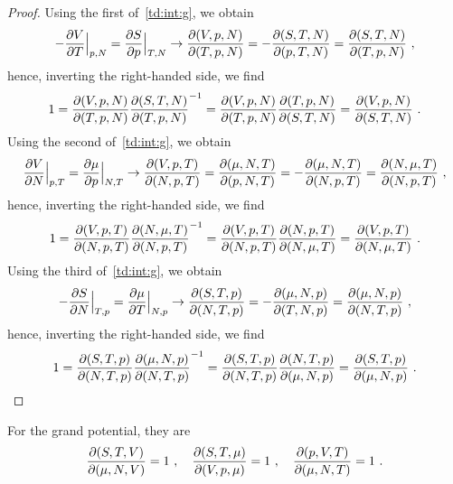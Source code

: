     \begin{proof}
        Using the first of~\eqref{td:int:g}, we obtain
        \begin{equation*}
            - \frac{\partial V}{\partial T} \Big \vert_{p, N} = \frac{\partial S}{\partial p} \Big \vert_{T, N} \rightarrow \frac{\partial(V, p, N)}{\partial(T, p, N)} = - \frac{\partial(S, T, N)}{\partial(p, T, N)} = \frac{\partial(S, T, N)}{\partial(T, p, N)} ~,
        \end{equation*} 
        hence, inverting the right-handed side, we find
        \begin{equation*}
            1 = \frac{\partial(V, p, N)}{\partial(T, p, N)} \frac{\partial(S, T, N)}{\partial(T, p, N)}^{-1} = \frac{\partial(V, p, N)}{\partial(T, p, N)} \frac{\partial(T, p, N)}{\partial(S, T, N)} = \frac{\partial(V, p, N)}{\partial(S, T, N)} ~.
        \end{equation*} 
        Using the second of~\eqref{td:int:g}, we obtain
        \begin{equation*}
            \frac{\partial V}{\partial N} \Big \vert_{p, T} = \frac{\partial\mu}{\partial p} \Big \vert_{N, T} \rightarrow \frac{\partial(V, p, T)}{\partial(N, p, T)} = \frac{\partial(\mu, N, T)}{\partial(p, N, T)} = - \frac{\partial(\mu, N, T)}{\partial(N, p, T)} = \frac{\partial(N, \mu, T)}{\partial(N, p, T)} ~,
        \end{equation*} 
        hence, inverting the right-handed side, we find
        \begin{equation*}
            1 = \frac{\partial(V, p, T)}{\partial(N, p, T)} \frac{\partial(N, \mu, T)}{\partial(N, p, T)}^{-1} = \frac{\partial(V, p, T)}{\partial(N, p, T)} \frac{\partial(N, p, T)}{\partial(N, \mu, T)} = \frac{\partial(V, p, T)}{\partial(N, \mu, T)} ~.
        \end{equation*} 
        Using the third of~\eqref{td:int:g}, we obtain
        \begin{equation*}
            - \frac{\partial S}{\partial N} \Big \vert_{T, p} = \frac{\partial\mu}{\partial T} \Big \vert_{N, p} \rightarrow \frac{\partial(S, T, p)}{\partial(N, T, p)} = - \frac{\partial(\mu, N, p)}{\partial(T, N, p)} = \frac{\partial(\mu, N, p)}{\partial(N, T, p)} ~,
        \end{equation*} 
        hence, inverting the right-handed side, we find
        \begin{equation*}
            1 = \frac{\partial(S, T, p)}{\partial(N, T, p)} \frac{\partial(\mu, N, p)}{\partial(N, T, p)}^{-1} = \frac{\partial(S, T, p)}{\partial(N, T, p)} \frac{\partial(N, T, p)}{\partial(\mu, N, p)} = \frac{\partial(S, T, p)}{\partial(\mu, N, p)} ~.
        \end{equation*} 
    \end{proof}
    For the grand potential, they are 
    \begin{equation*}
        \frac{\partial(S, T, V)}{\partial(\mu, N, V)} = 1 ~, \quad \frac{\partial(S, T, \mu)}{\partial(V, p, \mu)} = 1 ~, \quad \frac{\partial(p, V, T)}{\partial(\mu, N, T)} = 1 ~.
    \end{equation*}
